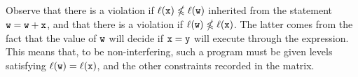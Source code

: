 \documentclass[conference]{IEEEtran}
\newcommand{\vi}{\usym{1F322}} %
\newcommand{\nv}{\cdot} %
\begin{document}
Observe that there is a violation if \(\ell(\mathtt{x}) \nleqslant \ell(\mathtt{w})\) inherited from the statement $\mathtt{w}=\mathtt{w} + \mathtt{x}$, and that there is a violation if \(\ell(\mathtt{w}) \nleqslant \ell(\mathtt{x})\).
The latter comes from the fact that the value of \(\mathtt{w}\) will decide if \(\mathtt{x}=\mathtt{y}\) will execute through the expression.
This means that, to be non-interfering, such a program must be given levels satisfying \(\ell(\mathtt{w}) = \ell(\mathtt{x})\), and the other constraints recorded in the matrix.
	
\end{document}
